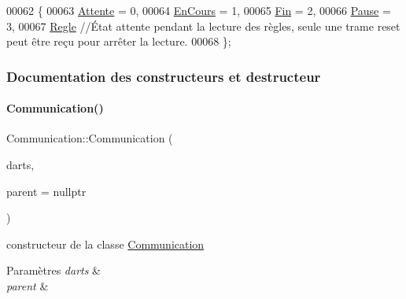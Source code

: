 \begin{DoxyCode}
00062     \{
00063         \hyperlink{class_communication_aaa8ce2e87a389c88f4f9a2f07b66ebdda1c2ad067e6861802f9f48fe30001f4dc}{Attente} = 0,
00064         \hyperlink{class_communication_aaa8ce2e87a389c88f4f9a2f07b66ebdda46965d82c1659dbd82d6b69aad687e54}{EnCours} = 1,
00065         \hyperlink{class_communication_aaa8ce2e87a389c88f4f9a2f07b66ebddafa4e2a4dbf887d1384efe5432e17d57f}{Fin} = 2,
00066         \hyperlink{class_communication_aaa8ce2e87a389c88f4f9a2f07b66ebddae5ff9fbf58fec2640ed18150aa660bd1}{Pause} = 3,
00067         \hyperlink{class_communication_aaa8ce2e87a389c88f4f9a2f07b66ebdda340ac4e51b04541499e50164be9d4d9f}{Regle}       \textcolor{comment}{//État attente pendant la lecture des règles, seule une trame reset peut être reçu
       pour arrêter la lecture.}
00068     \};
\end{DoxyCode}


\subsubsection{Documentation des constructeurs et destructeur}
\mbox{\label{class_communication_a6dd505094f1af1ccd25c6b75c18636d6}} 
\paragraph{\texorpdfstring{Communication()}{Communication()}}
{\footnotesize\ttfamily Communication\+::\+Communication (\begin{DoxyParamCaption}\item[{\hyperlink{class_darts}{Darts} $\ast$}]{darts,  }\item[{\hyperlink{class_q_object}{Q\+Object} $\ast$}]{parent = {\ttfamily nullptr} }\end{DoxyParamCaption})\hspace{0.3cm}{\ttfamily [explicit]}}



constructeur de la classe \hyperlink{class_communication}{Communication} 


\begin{DoxyParams}{Paramètres}
{\em darts} & \\
\hline
{\em parent} & \\
\hline
\end{DoxyParams}


